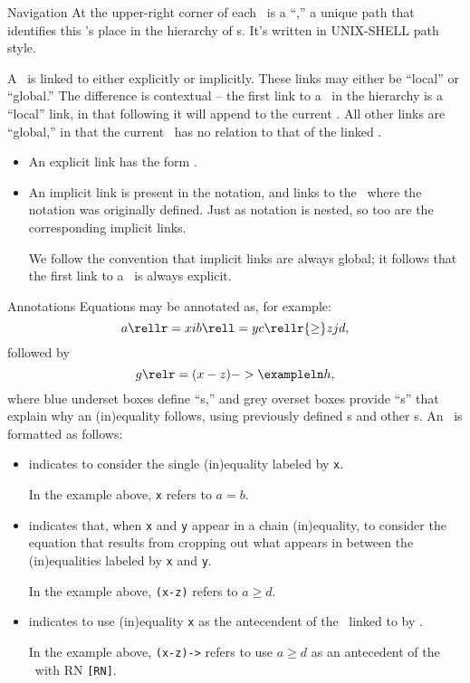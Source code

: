 \begin{part}{Navigation}
  At the upper-right corner of each \ is a ``,'' 
  a unique path that identifies this 's place in the hierarchy of s.
  It's written in UNIX-SHELL path style.

  \nrp
  A \ is linked to either explicitly or implicitly.
  These links may either be ``local'' or ``global.'' 
  The difference is contextual -- the 
  first link to a \ in the hierarchy
  is a ``local'' link, in that following it will append to the current .
  All other links are ``global,'' in that the current \ has
  no relation to that of the linked .
  \begin{itemize}
    \item \nrp An explicit link has the form \exampleln.
    \item \nrp An implicit link is present in the notation, 
      and links to the \ where the notation was originally defined.
      Just as notation is nested, so too are the corresponding implicit links.

      We follow the convention that implicit links are always global;
      it follows that the first link to a \ is always explicit.
  \end{itemize}
\end{part}

\begin{part}{Annotations}
  \nrp
  Equations may be annotated as, for example:
  $$a \rellr = x i b \rell = y c \rellr {\ge} z j d,$$
  followed by
  $$g \relr = {(x-z)->\exampleln} h,$$
  where blue underset boxes define ``s,''
  and grey overset boxes provide ``\explnl{}s'' that explain why an (in)equality follows, 
  using previously defined s and other s.
  An \explnl\ is formatted as follows:
  \begin{itemize}
    \item {} indicates to consider the single (in)equality labeled by {\tt x}.

      In the example above, {\tt x} refers to $a = b$.
    \item {} indicates that, when {\tt x} and {\tt y} appear in a chain (in)equality,
      to consider the equation that results from cropping out what appears 
      in between the (in)equalities labeled by {\tt x} and {\tt y}.

      In the example above, {\tt(x-z)} refers to $a \ge d$.
    \item {} indicates to use (in)equality {\tt x}
      as the antecendent of the \ linked to by \exampleln.

      In the example above, {\tt(x-z)->\exampleln} refers to use $a \ge d$
      as an antecedent of the \ with RN {\tt[RN]}.
  \end{itemize}
\end{part}

